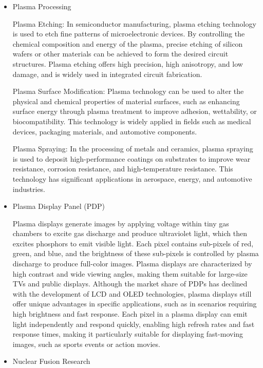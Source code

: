 \begin{itemize}
	\item Plasma Processing
	
	Plasma Etching: In semiconductor manufacturing, plasma etching technology is used to etch fine patterns of microelectronic devices. By controlling the chemical composition and energy of the plasma, precise etching of silicon wafers or other materials can be achieved to form the desired circuit structures. Plasma etching offers high precision, high anisotropy, and low damage, and is widely used in integrated circuit fabrication.
	
	Plasma Surface Modification: Plasma technology can be used to alter the physical and chemical properties of material surfaces, such as enhancing surface energy through plasma treatment to improve adhesion, wettability, or biocompatibility. This technology is widely applied in fields such as medical devices, packaging materials, and automotive components.
	
	Plasma Spraying: In the processing of metals and ceramics, plasma spraying is used to deposit high-performance coatings on substrates to improve wear resistance, corrosion resistance, and high-temperature resistance. This technology has significant applications in aerospace, energy, and automotive industries.
	
	\item Plasma Display Panel (PDP)
	
	Plasma displays generate images by applying voltage within tiny gas chambers to excite gas discharge and produce ultraviolet light, which then excites phosphors to emit visible light. Each pixel contains sub-pixels of red, green, and blue, and the brightness of these sub-pixels is controlled by plasma discharge to produce full-color images. Plasma displays are characterized by high contrast and wide viewing angles, making them suitable for large-size TVs and public displays. Although the market share of PDPs has declined with the development of LCD and OLED technologies, plasma displays still offer unique advantages in specific applications, such as in scenarios requiring high brightness and fast response. Each pixel in a plasma display can emit light independently and respond quickly, enabling high refresh rates and fast response times, making it particularly suitable for displaying fast-moving images, such as sports events or action movies.
	
	\item Nuclear Fusion Research
	

\end{itemize}

